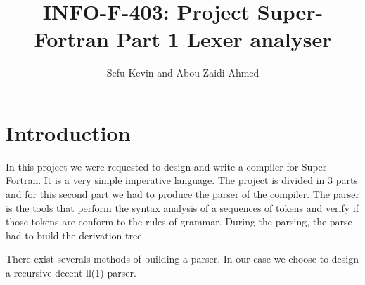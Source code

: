 \documentclass[12pt]{article}
\title{INFO-F-403: Project Super-Fortran Part 1 Lexer analyser}
\author{Sefu Kevin and Abou Zaidi Ahmed}
\begin{document}
\maketitle
\section{Introduction}
In this project we were requested to design and write a compiler for Super-Fortran. It is a very simple 
imperative language. The project is divided in 3 parts and for this second part we had to produce 
the parser of the compiler. The parser is the tools that perform the syntax analysis of a sequences of tokens and verify if
those tokens are conform to the rules of grammar. During the parsing, the parse had to build the derivation tree.

There exist severals methods of building a parser. In our case we choose to design a recursive decent ll(1) parser.
\end{document}
